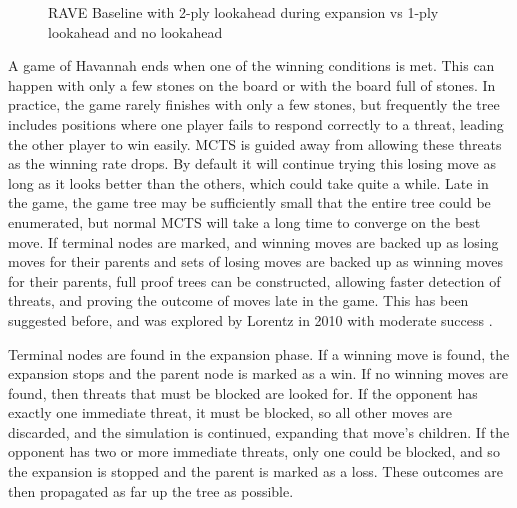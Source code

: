 \begin{figure}
\centering
{}
	\caption{RAVE Baseline with 2-ply lookahead during expansion vs 1-ply lookahead and no lookahead}
	\label{fig:proofbackups}
\end{figure}

A game of Havannah ends when one of the winning conditions is met. This can happen with only a few stones on the board or with the board full of stones. In practice, the game rarely finishes with only a few stones, but frequently the tree includes positions where one player fails to respond correctly to a threat, leading the other player to win easily. MCTS is guided away from allowing these threats as the winning rate drops. By default it will continue trying this losing move as long as it looks better than the others, which could take quite a while. Late in the game, the game tree may be sufficiently small that the entire tree could be enumerated, but normal MCTS will take a long time to converge on the best move. If terminal nodes are marked, and winning moves are backed up as losing moves for their parents and sets of losing moves are backed up as winning moves for their parents, full proof trees can be constructed, allowing faster detection of threats, and proving the outcome of moves late in the game. This has been suggested before, and was explored by Lorentz in 2010 with moderate success \cite{lorentz2011improving}.

Terminal nodes are found in the expansion phase. If a winning move is found, the expansion stops and the parent node is marked as a win. If no winning moves are found, then threats that must be blocked are looked for. If the opponent has exactly one immediate threat, it must be blocked, so all other moves are discarded, and the simulation is continued, expanding that move's children. If the opponent has two or more immediate threats, only one could be blocked, and so the expansion is stopped and the parent is marked as a loss. These outcomes are then propagated as far up the tree as possible.

